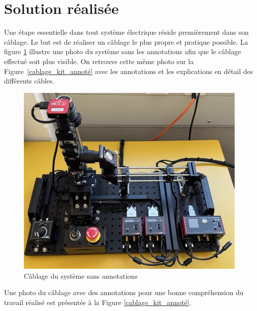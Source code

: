 \section{Solution réalisée}
Une étape essentielle dans tout système électrique réside premièrement dans son câblage. Le but est de réaliser un câblage le plus propre et pratique possible. La figure \ref{cablage_kit_pas_annoté} illustre une photo du système sans les annotations afin que le câblage effectué soit plus visible. On retrouve cette même photo sur la Figure~\ref{cablage_kit_annoté} avec les annotations et les explications en détail des différents câbles.
\begin{figure}[H]
    \begin{center}
        \includegraphics[width=\textwidth]{assets/figures/Cablage_du_kit/Cablage_vierge.jpeg}
    \end{center}
    \caption{Câblage du système sans annotations}
    \label{cablage_kit_pas_annoté}
\end{figure}

\newpage
Une photo du câblage avec des annotations pour une bonne compréhension du travail réalisé est présentée à la Figure \ref{cablage_kit_annoté}.


